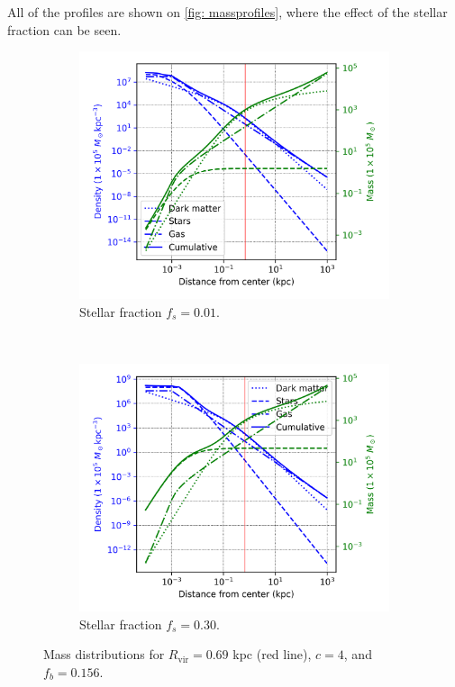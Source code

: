 			All of the profiles are shown on \autoref{fig: massprofiles}, where the effect of the stellar fraction can be seen.
			\begin{figure}[h]
				\centering
				\begin{subfigure}[b]{0.49\textwidth}
					\includegraphics[width=\textwidth]{"../Files/Week 6/density_mass_fs01"}
					\caption{Stellar fraction $f_s = 0.01$.}
					\label{fig: baryonicprofilehigh}
				\end{subfigure}
				~ 
				\begin{subfigure}[b]{0.49\textwidth}
					\includegraphics[width=\textwidth]{"../Files/Week 6/density_mass_fs3"}
					\caption{Stellar fraction $f_s = 0.30$.}
					\label{fig: baryonicprofilelow}
				\end{subfigure}
				\caption{Mass distributions for $R_\text{vir} = 0.69$ kpc (red line), $c = 4$, and $f_b = 0.156$.}
				\label{fig: massprofiles}
			\end{figure}
		
